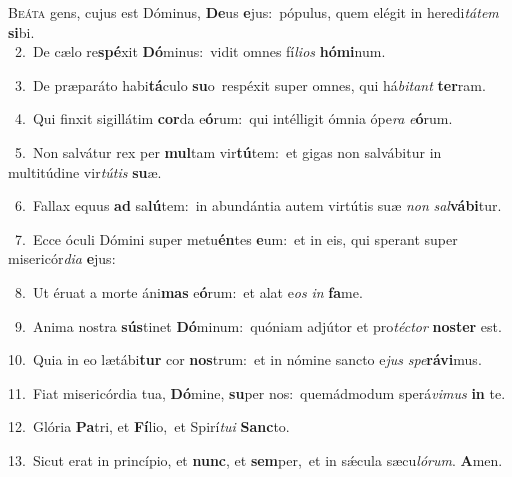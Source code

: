 \lettrine{\initial\textcolor{\initialcolor}{B}}{eáta} gens, cujus est Dóminus, \textbf{De}\-us \textbf{e}\-jus:~\star pópulus, quem elégit in heredi\-\textit{tá}\-\textit{tem} \textbf{si}\-bi.\\
{\numbfont\textcolor{\numbcolor}{~2.}}~De cælo re\-\textbf{spé}\-xit \textbf{Dó}\-minus:~\star vidit omnes fí\-\textit{li}\-\textit{os} \textbf{hó}\-\textbf{mi}num.\par
{\numbfont\textcolor{\numbcolor}{~3.}}~De præparáto habi\-\textbf{tá}\-culo \textbf{su}\-o~\star respéxit super omnes, qui há\-\textit{bi}\-\textit{tant} \textbf{ter}\-ram.\par
{\numbfont\textcolor{\numbcolor}{~4.}}~Qui finxit sigillátim \textbf{cor}\-da e\-\textbf{ó}\-rum:~\star qui intélligit ómnia ópe\textit{ra} \textit{e}\-\textbf{ó}rum.\par
{\numbfont\textcolor{\numbcolor}{~5.}}~Non salvátur rex per \textbf{mul}\-tam vir\-\textbf{tú}\-tem:~\star et gigas non salvábitur in multitúdine vir\-\textit{tú}\-\textit{tis} \textbf{su}\-æ.\par
{\numbfont\textcolor{\numbcolor}{~6.}}~Fallax equus \textbf{ad} sa\-\textbf{lú}\-tem:~\star in abundántia autem virtútis suæ \textit{non} \textit{sal}\-\textbf{vá}\textbf{bi}tur.\par
{\numbfont\textcolor{\numbcolor}{~7.}}~Ecce óculi Dómini super metu\-\textbf{én}\-tes \textbf{e}\-um:~\star et in eis, qui sperant super misericór\-\textit{di}\-\textit{a} \textbf{e}\-jus:\par
{\numbfont\textcolor{\numbcolor}{~8.}}~Ut éruat a morte áni\textbf{mas} e\-\textbf{ó}\-rum:~\star et alat e\textit{os} \textit{in} \textbf{fa}\-me.\par
{\numbfont\textcolor{\numbcolor}{~9.}}~Anima nostra \textbf{sús}\-tinet \textbf{Dó}\-minum:~\star quóniam adjútor et pro\-\textit{téc}\-\textit{tor} \textbf{nos}\-\textbf{ter} est.\par
{\numbfont\textcolor{\numbcolor}{10.}}~Quia in eo lætábi\textbf{tur} cor \textbf{nos}\-trum:~\star et in nómine sancto e\textit{jus} \textit{spe}\-\textbf{rá}\textbf{vi}mus.\par
{\numbfont\textcolor{\numbcolor}{11.}}~Fiat misericórdia tua, \textbf{Dó}\-mine, \textbf{su}\-per nos:~\star quemádmodum sperá\-\textit{vi}\-\textit{mus} \textbf{in} te.\par
{\numbfont\textcolor{\numbcolor}{12.}}~Glória \textbf{Pa}\-tri, et \textbf{Fí}\-lio,~\star et Spirí\-\textit{tu}\-\textit{i} \textbf{Sanc}\-to.\par
{\numbfont\textcolor{\numbcolor}{13.}}~Sicut erat in princípio, et \textbf{nunc}\-, et \textbf{sem}\-per,~\star et in sǽcula sæcu\-\textit{ló}\-\textit{rum}. \textbf{A}\-men.\par

